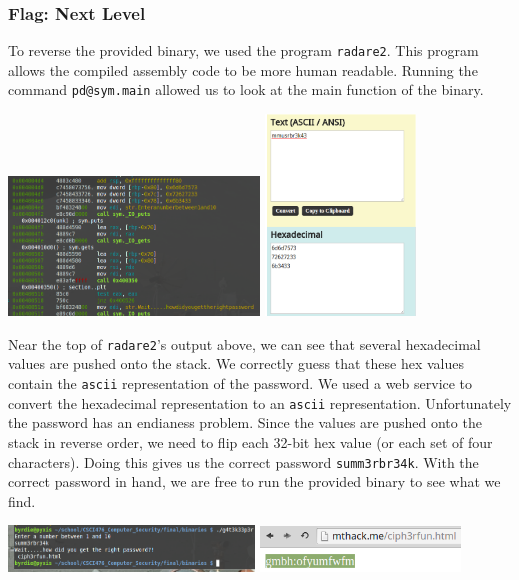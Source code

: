 \documentclass[10pt,a4paper,titlepage]{article}
\begin{document}
\subsubsection{Flag: Next Level}
To reverse the provided binary, we used the program \texttt{radare2}. This program allows the compiled assembly code to be more human readable. Running the command \texttt{pd@sym.main} allowed us to look at the main function of the binary.
\begin{center}
\includegraphics[width=0.5\textwidth]{binary_flags/nextlevel/radare2}
\includegraphics[width=0.3\textwidth]{binary_flags/nextlevel/hex_to_ascii}
\end{center}
Near the top of \texttt{radare2}'s output above, we can see that several hexadecimal values are pushed onto the stack. We correctly guess that these hex values contain the \texttt{ascii} representation of the password. We used a web service to convert the hexadecimal representation to an \texttt{ascii} representation.
Unfortunately the password has an endianess problem. Since the values are pushed onto the stack in reverse order, we need to flip each 32-bit hex value (or each set of four characters). Doing this gives us the correct password \texttt{summ3rbr34k}. With the correct password in hand, we are free to run the provided binary to see what we find.
\begin{center}
\includegraphics[width=0.49\textwidth]{binary_flags/nextlevel/output}
\includegraphics[width=0.40\textwidth]{binary_flags/nextlevel/cipher}
\end{center}
\end{document}
